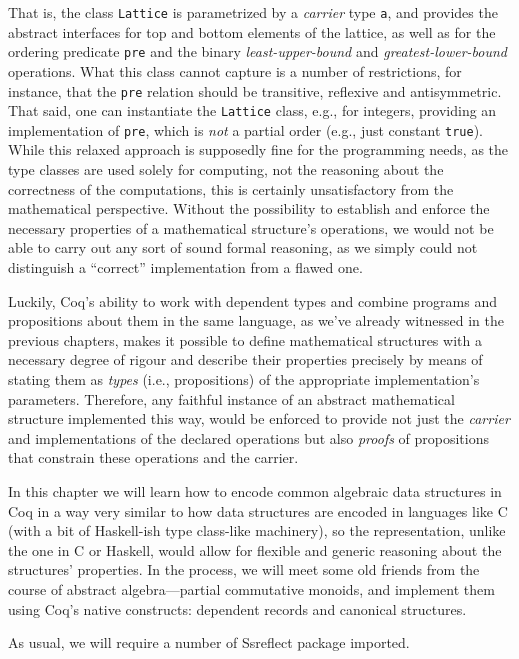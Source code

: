 That is, the class \texttt{Lattice} is parametrized by a \textit{carrier}
type \texttt{a}, and provides the abstract interfaces for top and
bottom elements of the lattice, as well as for the ordering predicate
\texttt{pre} and the binary \textit{least-upper-bound} and
\textit{greatest-lower-bound} operations. What this class cannot capture is a
number of restrictions, for instance, that the \texttt{pre} relation
should be transitive, reflexive and antisymmetric. That said, one can
instantiate the \texttt{Lattice} class, e.g., for integers,
 providing an implementation of \texttt{pre}, which
is \textit{not} a partial order (e.g., just constant \texttt{true}). While
this relaxed approach is supposedly fine for the programming needs, as
the type classes are used solely for computing, not the reasoning
about the correctness of the computations, this is certainly
unsatisfactory from the mathematical perspective. Without the
possibility to establish and enforce the necessary properties of a
mathematical structure's operations, we would not be able to carry out
any sort of sound formal reasoning, as we simply could not distinguish
a ``correct'' implementation from a flawed one.


Luckily, Coq's ability to work with dependent types and combine
programs and propositions about them in the same language, as we've
already witnessed in the previous chapters, makes it possible to
define mathematical structures with a necessary degree of rigour and
describe their properties precisely by means of stating them as
\textit{types} (i.e., propositions) of the appropriate implementation's
parameters. Therefore, any faithful instance of an abstract
mathematical structure implemented this way, would be enforced to
provide not just the \textit{carrier} and implementations of the declared
operations but also \textit{proofs} of propositions that constrain these
operations and the carrier.


In this chapter we will learn how to encode common algebraic data
structures in Coq in a way very similar to how data structures are
encoded in languages like C (with a bit of Haskell-ish type class-like
machinery), so the representation, unlike the one in C or Haskell,
would allow for flexible and generic reasoning about the structures'
properties. In the process, we will meet some old friends from the
course of abstract algebra---partial commutative monoids, and implement
them using Coq's native constructs: dependent records and canonical
structures.


As usual, we will require a number of Ssreflect package imported.



